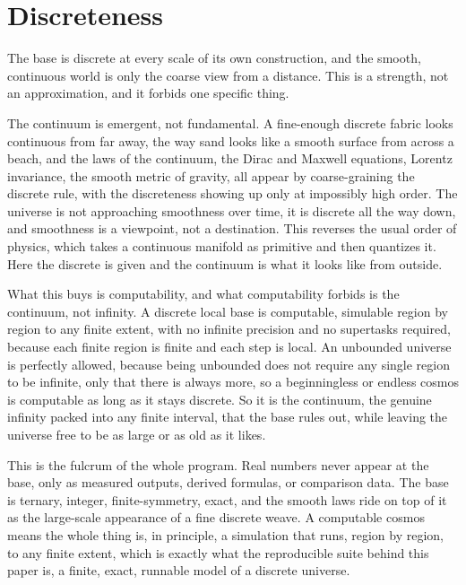 \section{Discreteness}

The base is discrete at every scale of its own construction, and the smooth, continuous world is only the coarse view
from a distance. This is a strength, not an approximation, and it forbids one specific thing.

The continuum is emergent, not fundamental. A fine-enough discrete fabric looks continuous from far away, the way sand
looks like a smooth surface from across a beach, and the laws of the continuum, the Dirac and Maxwell equations, Lorentz
invariance, the smooth metric of gravity, all appear by coarse-graining the discrete rule, with the discreteness showing
up only at impossibly high order. The universe is not approaching smoothness over time, it is discrete all the way down,
and smoothness is a viewpoint, not a destination. This reverses the usual order of physics, which takes a continuous
manifold as primitive and then quantizes it. Here the discrete is given and the continuum is what it looks like from
outside.

What this buys is computability, and what computability forbids is the continuum, not infinity. A discrete local base is
computable, simulable region by region to any finite extent, with no infinite precision and no supertasks required,
because each finite region is finite and each step is local. An unbounded universe is perfectly allowed, because being
unbounded does not require any single region to be infinite, only that there is always more, so a beginningless or
endless cosmos is computable as long as it stays discrete. So it is the continuum, the genuine infinity packed into any
finite interval, that the base rules out, while leaving the universe free to be as large or as old as it likes.

This is the fulcrum of the whole program. Real numbers never appear at the base, only as measured outputs, derived
formulas, or comparison data. The base is ternary, integer, finite-symmetry, exact, and the smooth laws ride on top of it
as the large-scale appearance of a fine discrete weave. A computable cosmos means the whole thing is, in principle, a
simulation that runs, region by region, to any finite extent, which is exactly what the reproducible suite behind this
paper is, a finite, exact, runnable model of a discrete universe.
